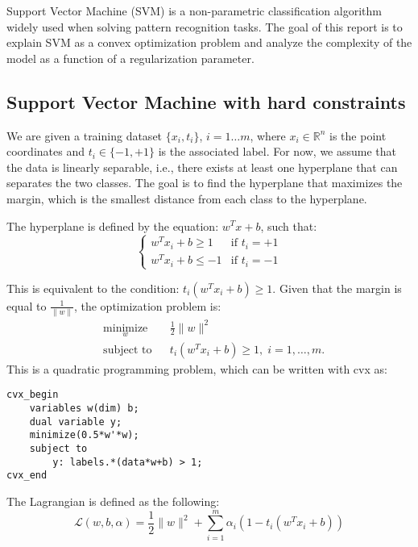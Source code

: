 \label{sec:intro}

Support Vector Machine (SVM) is a non-parametric classification algorithm widely used when solving pattern recognition tasks. The goal of this report is to explain SVM as a convex optimization problem and analyze the complexity of the model as a function of a regularization parameter.
\subsection{Support Vector Machine with hard constraints}
We are given a training dataset $\{x_i, t_i\}$, $i=1\ldots m$, where $x_i \in \mathbb{R}^n$ is the point coordinates and  $t_i \in \{-1,+1 \}$ is the associated label. For now, we assume that the data is linearly separable, i.e., there exists at least one hyperplane that can separates the two classes. The goal is to find the hyperplane that maximizes the margin, which is the smallest distance from each class to the hyperplane.

The hyperplane is defined by the equation: $w^Tx+b$, such that:
\[
  \begin{cases} 
   w^Tx_i+b \geq 1 & \text{if } t_i=+1 \\
   w^Tx_i+b \leq -1       & \text{if } t_i=-1
  \end{cases}
\]

This is equivalent to the condition: $ t_i(w^Tx_i+b) \geq 1$.
Given that the margin is equal to $\frac{1}{\|w\|}$, the optimization problem is:
\begin{equation}
\begin{aligned}
& \underset{w}{\text{minimize}}
& & \frac{1}{2}\|w\|^2 \\
& \text{subject to}
& & t_i(w^Tx_i+b) \geq 1, \; i = 1, \ldots, m.
\label{eq:svm_hard}
\end{aligned}
\end{equation}
This is a quadratic programming problem, which can be written with cvx as:
\begin{verbatim}
cvx_begin
    variables w(dim) b; 
    dual variable y;
    minimize(0.5*w'*w);
    subject to 
  	    y: labels.*(data*w+b) > 1; 
cvx_end
\end{verbatim}
The Lagrangian is defined as the following: 
\begin{equation}
  \mathcal{L}(w,b,\alpha)= \frac{1}{2} \|w\|^2+\sum\limits_{i=1}^m \alpha_i (1-t_i(w^Tx_i+b))
\end{equation}

